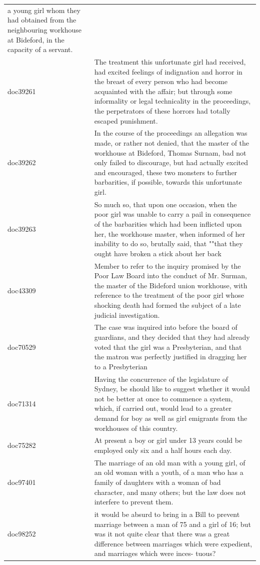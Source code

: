 \documentclass[
]{article}
\begin{document}
\begin{longtable}[t]{ll}
a young girl whom they had obtained from the neighbouring
workhouse at Bideford, in the capacity of a servant.\\
doc39261 & The treatment this unfortunate girl had received, had
excited feelings of indignation and horror in the breast
of every person who had become acquainted with the affair;
but through some informality or legal technicality in the
proceedings, the perpetrators of these horrors had totally
escaped punishment.\\
doc39262 & In the course of the proceedings an allegation was made,
or rather not denied, that the master of the workhouse at
Bideford, Thomas Surnam, bad not only failed to discourage,
but had actually excited and encouraged, these two
monsters to further barbarities, if possible, towards this
unfortunate girl.\\
doc39263 & So much so, that upon one occasion, when the poor girl was
unable to carry a pail in consequence of the barbarities
which had been inflicted upon her, the workhouse master,
when informed of her inability to do so, brutally said, that
""that they ought have broken a stick about her back\\
doc43309 & Member to refer to the inquiry promised by the Poor Law
Board into the conduct of Mr. Surman, the master of the
Bideford union workhouse, with reference to the treatment of
the poor girl whose shocking death had formed the subject of
a late judicial investigation.\\
\addlinespace
doc70529 & The case was inquired into before the board of guardians,
and they decided that they had already voted that the
girl was a Presbyterian, and that the matron was perfectly
justified in dragging her to a Presbyterian\\
doc71314 & Having the concurrence of the legislature of Sydney, be
should like to suggest whether it would not be better at
once to commence a system, which, if carried out, would lead
to a greater demand for boy as well as girl emigrants from
the workhouses of this country.\\
doc75282 & At present a boy or girl under 13 years could be employed
only six and a half hours each day.\\
doc97401 & The marriage of an old man with a young girl, of an old
woman with a youth, of a man who has a family of daughters
with a woman of bad character, and many others; but the law
does not interfere to prevent them.\\
doc98252 & it would be absurd to bring in a Bill to prevent marriage
between a man of 75 and a girl of 16; but was it not quite
clear that there was a great difference between marriages
which were expedient, and marriages which were inces- tuous?\\
\bottomrule
\end{longtable}
\end{document}
